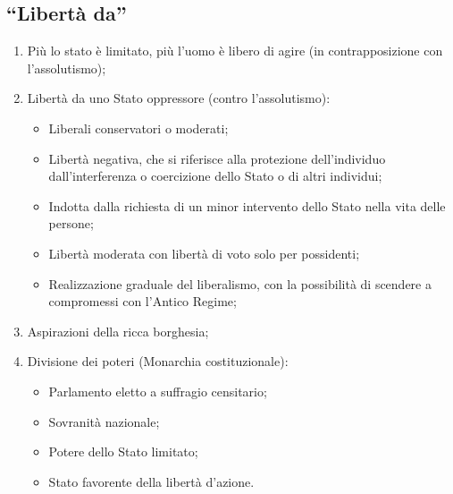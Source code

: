 \documentclass{article}
\begin{document}
\subsection{``Libertà da''}
\begin{enumerate}
    \item Più lo stato è limitato, più l'uomo è libero di agire (in contrapposizione con
        l'assolutismo);
    \item Libertà da uno Stato oppressore (contro l'assolutismo):
        \begin{itemize}
            \item Liberali conservatori o moderati;
            \item Libertà negativa, che si riferisce alla protezione dell'individuo
                dall'interferenza o coercizione dello Stato o di altri individui;
            \item Indotta dalla richiesta di un minor intervento dello Stato nella vita delle
                persone;
            \item Libertà moderata con libertà di voto solo per possidenti;
            \item Realizzazione graduale del liberalismo, con la possibilità di scendere a 
                compromessi con l'Antico Regime; 
        \end{itemize}
    \item Aspirazioni della ricca borghesia;
    \item Divisione dei poteri (Monarchia costituzionale):
        \begin{itemize}
            \item Parlamento eletto a suffragio censitario;
            \item Sovranità nazionale;
            \item Potere dello Stato limitato;
            \item Stato favorente della libertà d'azione.
        \end{itemize}
\end{enumerate}
\end{document}
